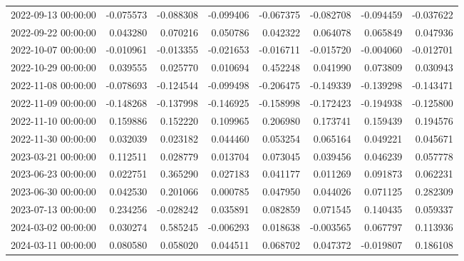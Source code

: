 \begin{tabular}{lrrrrrrr}
2022-09-13 00:00:00 & -0.075573 & -0.088308 & -0.099406 & -0.067375 & -0.082708 & -0.094459 & -0.037622 \\
2022-09-22 00:00:00 & 0.043280 & 0.070216 & 0.050786 & 0.042322 & 0.064078 & 0.065849 & 0.047936 \\
2022-10-07 00:00:00 & -0.010961 & -0.013355 & -0.021653 & -0.016711 & -0.015720 & -0.004060 & -0.012701 \\
2022-10-29 00:00:00 & 0.039555 & 0.025770 & 0.010694 & 0.452248 & 0.041990 & 0.073809 & 0.030943 \\
2022-11-08 00:00:00 & -0.078693 & -0.124544 & -0.099498 & -0.206475 & -0.149339 & -0.139298 & -0.143471 \\
2022-11-09 00:00:00 & -0.148268 & -0.137998 & -0.146925 & -0.158998 & -0.172423 & -0.194938 & -0.125800 \\
2022-11-10 00:00:00 & 0.159886 & 0.152220 & 0.109965 & 0.206980 & 0.173741 & 0.159439 & 0.194576 \\
2022-11-30 00:00:00 & 0.032039 & 0.023182 & 0.044460 & 0.053254 & 0.065164 & 0.049221 & 0.045671 \\
2023-03-21 00:00:00 & 0.112511 & 0.028779 & 0.013704 & 0.073045 & 0.039456 & 0.046239 & 0.057778 \\
2023-06-23 00:00:00 & 0.022751 & 0.365290 & 0.027183 & 0.041177 & 0.011269 & 0.091873 & 0.062231 \\
2023-06-30 00:00:00 & 0.042530 & 0.201066 & 0.000785 & 0.047950 & 0.044026 & 0.071125 & 0.282309 \\
2023-07-13 00:00:00 & 0.234256 & -0.028242 & 0.035891 & 0.082859 & 0.071545 & 0.140435 & 0.059337 \\
2024-03-02 00:00:00 & 0.030274 & 0.585245 & -0.006293 & 0.018638 & -0.003565 & 0.067797 & 0.113936 \\
2024-03-11 00:00:00 & 0.080580 & 0.058020 & 0.044511 & 0.068702 & 0.047372 & -0.019807 & 0.186108 \\
\bottomrule
\end{tabular}
